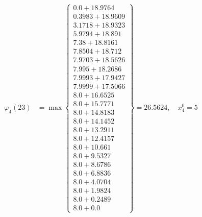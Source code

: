 \documentclass{article}
\begin{document}
\begin{align*}
  
  
  
\varphi_{4}(23) &= \max \left\{ \begin{array}{c}
0.0 + 18.9764 \\
 0.3983 + 18.9609 \\
 3.1718 + 18.9323 \\
 5.9794 + 18.891 \\
 7.38 + 18.8161 \\
 7.8504 + 18.712 \\
 7.9703 + 18.5626 \\
 7.995 + 18.2686 \\
 7.9993 + 17.9427 \\
 7.9999 + 17.5066 \\
 8.0 + 16.6525 \\
 8.0 + 15.7771 \\
 8.0 + 14.8183 \\
 8.0 + 14.1452 \\
 8.0 + 13.2911 \\
 8.0 + 12.4157 \\
 8.0 + 10.661 \\
 8.0 + 9.5327 \\
 8.0 + 8.6786 \\
 8.0 + 6.8836 \\
 8.0 + 4.0704 \\
 8.0 + 1.9824 \\
 8.0 + 0.2489 \\
 8.0 + 0.0
\end{array} \right\}=26.5624,\quad x_{4}^0=5\\
  
  
  

\end{align*}
\end{document}
